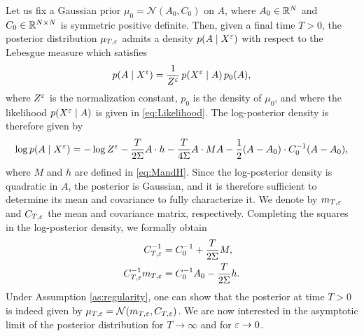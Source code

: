 \documentclass[10pt]{article}
\begin{document}
Let us fix a Gaussian prior $\mu_0 = \mathcal N(A_0, C_0)$ on $A$, where $A_0 \in \mathbb{R}^N$ and $C_0 \in \mathbb{R}^{N\times N}$ is symmetric positive definite. Then, given a final time $T > 0$, the posterior distribution $\mu_{T,\varepsilon}$ admits a density $p(A \mid X^\varepsilon)$ with respect to the Lebesgue measure which satisfies
\begin{equation}
p(A \mid X^\varepsilon) = \frac1{Z^\varepsilon} \, p(X^\varepsilon \mid A) \, p_0(A),
\end{equation}
where $Z^\varepsilon$ is the normalization constant, $p_0$ is the density of $\mu_0$, and where the likelihood $p(X^\varepsilon \mid A)$ is given in \eqref{eq:Likelihood}. The log-posterior density is therefore given by
\begin{equation}\label{eq:Posterior}
\log p(A \mid X^\varepsilon) = -\log Z^\varepsilon - \frac{T}{2\Sigma} A \cdot h - \frac{T}{4\Sigma} A \cdot M A - \frac12 (A - A_0) \cdot C_0^{-1}(A-A_0),
\end{equation}
where $M$ and $h$ are defined in \eqref{eq:MandH}.
Since the log-posterior density is quadratic in $A$, the posterior is Gaussian, and it is therefore sufficient to determine its mean and covariance to fully characterize it. We denote by $m_{T,\varepsilon}$ and $C_{T,\varepsilon}$ the mean and covariance matrix, respectively. Completing the squares in the log-posterior density, we formally obtain
\begin{equation}
\begin{aligned}
C_{T,\varepsilon}^{-1} &= C_0^{-1} + \frac{T}{2\Sigma} M, \\
C_{T,\varepsilon}^{-1}m_{T,\varepsilon} &= C_0^{-1}A_0 - \frac{T}{2\Sigma} h. 
\end{aligned}
\end{equation}
Under Assumption \ref{as:regularity}, one can show that the posterior at time $T > 0$ is indeed given by $\mu_{T,\varepsilon} = \mathcal N(m_{T,\varepsilon}, C_{T,\varepsilon})$. We are now interested in the asymptotic limit of the posterior distribution for $T \to \infty$ and for $\varepsilon \to 0$.
\end{document}
